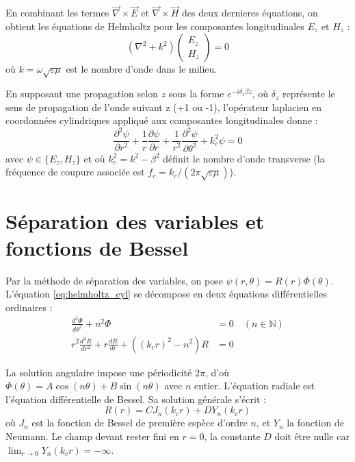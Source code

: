 \documentclass[12pt,a4paper]{report}
\begin{document}
En combinant les termes $\vec{\nabla} \times \vec{E}$ et $\vec{\nabla} \times \vec{H}$  des deux dernieres équations, on obtient les équations de Helmholtz pour les composantes longitudinales $E_z$ et $H_z$ :
\begin{equation}
\left( \nabla^2 + k^2 \right) \begin{pmatrix} E_z \\ H_z \end{pmatrix} = 0
\end{equation}
où $k = \omega \sqrt{\varepsilon\mu}$ est le nombre d'onde dans le milieu.

En supposant une propagation selon $z$ sous la forme $e^{-i \delta_z \beta z}$, où $\delta_z$ représente le sens de propagation de l'onde suivant z (+1 ou -1), l'opérateur laplacien en coordonnées cylindriques appliqué aux composantes longitudinales donne :
\begin{equation}
\frac{\partial^2 \psi}{\partial r^2} + \frac{1}{r}\frac{\partial \psi}{\partial r} + \frac{1}{r^2}\frac{\partial^2 \psi}{\partial \theta^2} + k_c^2 \psi = 0
\label{eq:helmholtz_cyl}
\end{equation}
avec $\psi \in \{E_z, H_z\}$ et où $k_c^2 = k^2 - \beta^2$ définit le nombre d'onde transverse (la fréquence de coupure associée est $f_c = k_c/(2\pi\sqrt{\varepsilon\mu})$).

\section{Séparation des variables et fonctions de Bessel}
Par la méthode de séparation des variables, on pose $\psi(r, \theta) = R(r)\Phi(\theta)$. L'équation \eqref{eq:helmholtz_cyl} se décompose en deux équations différentielles ordinaires :
\begin{align}
\frac{d^2\Phi}{d\theta^2} + n^2 \Phi &= 0 \quad (n \in \mathbb{N}) \\
r^2 \frac{d^2R}{dr^2} + r \frac{dR}{dr} + \left( (k_c r)^2 - n^2 \right) R &= 0
\end{align}

La solution angulaire impose une périodicité $2\pi$, d'où $\Phi(\theta) = A \cos(n\theta) + B \sin(n\theta)$ avec $n$ entier.
L'équation radiale est l'équation différentielle de Bessel. Sa solution générale s'écrit :
\begin{equation}
R(r) = C J_n(k_c r) + D Y_n(k_c r)
\end{equation}
où $J_n$ est la fonction de Bessel de première espèce d'ordre $n$, et $Y_n$ la fonction de Neumann. Le champ devant rester fini en $r = 0$, la constante $D$ doit être nulle car $\lim_{r\to 0} Y_n(k_c r) = -\infty$.
\end{document}

